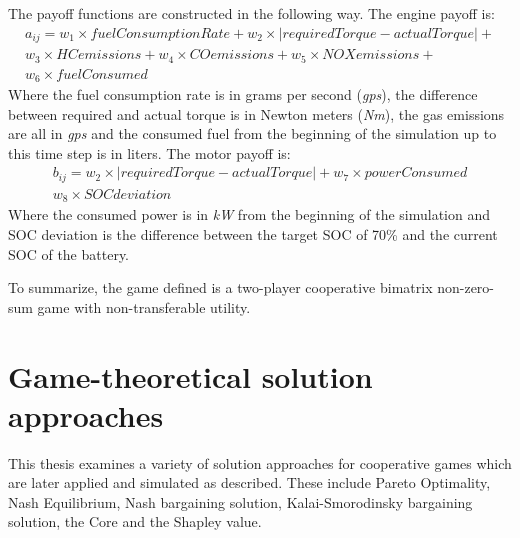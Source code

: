 The payoff functions are constructed in the following way. The engine payoff is:
\begin{equation}
\begin{split}
a_{ij} = w_1 \times fuelConsumptionRate + w_2 \times | requiredTorque - actualTorque | + \\
w_3 \times HCemissions + w_4 \times COemissions + w_5 \times NOXemissions + \\
w_6 \times fuelConsumed
\end{split}
\end{equation}
Where the fuel consumption rate is in grams per second (\textit{gps}), the difference between required and actual torque is in Newton meters (\textit{Nm}), the gas emissions are all in \textit{gps} and the consumed fuel from the beginning of the simulation up to this time step is in liters. The motor payoff is:
\begin{equation}
\begin{split}
b_{ij} = w_2 \times | requiredTorque - actualTorque | + w_7 \times powerConsumed\\
w_8 \times SOCdeviation
\end{split}
\end{equation}
Where the consumed power is in \textit{kW} from the beginning of the simulation and SOC deviation is the difference between the target SOC of 70\% and the current SOC of the battery.

To summarize, the game defined is a two-player cooperative bimatrix non-zero-sum game with non-transferable utility.

\section{Game-theoretical solution approaches}
This thesis examines a variety of solution approaches for cooperative games which are later applied and simulated as described. These include Pareto Optimality, Nash Equilibrium, Nash bargaining solution, Kalai-Smorodinsky bargaining solution, the Core and the Shapley value.

